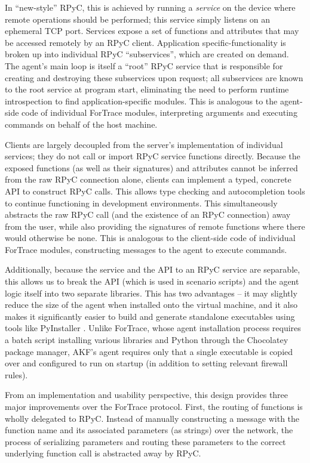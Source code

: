 \documentclass[letterpaper,12pt]{report}
\begin{document}
In ``new-style'' RPyC, this is achieved by running a \emph{service} on
the device where remote operations should be performed; this service
simply listens on an ephemeral TCP port. Services expose a set of
functions and attributes that may be accessed remotely by an RPyC
client. Application specific-functionality is broken up into individual
RPyC ``subservices'', which are created on demand. The agent's main loop
is itself a ``root'' RPyC service that is responsible for creating and
destroying these subservices upon request; all subservices are known to
the root service at program start, eliminating the need to perform
runtime introspection to find application-specific modules. This is
analogous to the agent-side code of individual ForTrace modules,
interpreting arguments and executing commands on behalf of the host
machine.

Clients are largely decoupled from the server's implementation of
individual services; they do not call or import RPyC service functions
directly. Because the exposed functions (as well as their signatures)
and attributes cannot be inferred from the raw RPyC connection alone,
clients can implement a typed, concrete API to construct RPyC calls.
This allows type checking and autocompletion tools to continue
functioning in development environments. This simultaneously abstracts
the raw RPyC call (and the existence of an RPyC connection) away from
the user, while also providing the signatures of remote functions where
there would otherwise be none. This is analogous to the client-side code
of individual ForTrace modules, constructing messages to the agent to
execute commands.

Additionally, because the service and the API to an RPyC service are
separable, this allows us to break the API (which is used in scenario
scripts) and the agent logic itself into two separate libraries. This
has two advantages -- it may slightly reduce the size of the agent when
installed onto the virtual machine, and it also makes it significantly
easier to build and generate standalone executables using tools like
PyInstaller \cite{PyinstallerPyinstaller2025}. Unlike ForTrace,
whose agent installation process requires a batch script installing
various libraries and Python through the Chocolatey package manager,
AKF's agent requires only that a single executable is copied over and
configured to run on startup (in addition to setting relevant firewall
rules).

From an implementation and usability perspective, this design provides
three major improvements over the ForTrace protocol. First, the routing
of functions is wholly delegated to RPyC. Instead of manually
constructing a message with the function name and its associated
parameters (as strings) over the network, the process of serializing
parameters and routing these parameters to the correct underlying
function call is abstracted away by RPyC.
\end{document}
